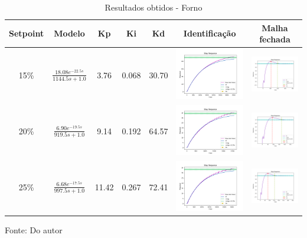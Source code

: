 \begin{table}[H]
    \caption{Resultados obtidos - Forno}
    \centering
    \begin{tabular}{|c|c|c|c|c|c|c|}
        \hline
        \textbf{Setpoint} & \textbf{Modelo}                          & \textbf{Kp} & \textbf{Ki} & \textbf{Kd} & \textbf{Identificação} & \textbf{Malha fechada} \\
        \hline
        15\%              & $\frac{18.08 e^{-22.5s}}{1144.5s + 1.0}$ & 3.76        & 0.068       & 30.70       & \includegraphics[width=0.2\linewidth]{figuras/forno_15} & \includegraphics[width=0.2\linewidth]{figuras/forno_15c} \\
        \hline
        20\%              & $\frac{6.90 e^{-19.5s}}{919.5s + 1.0}$   & 9.14        & 0.192       & 64.57       & \includegraphics[width=0.2\linewidth]{figuras/forno_20} & \includegraphics[width=0.2\linewidth]{figuras/forno_20c} \\
        \hline
        25\%              & $\frac{6.68 e^{-17.5s}}{997.5s + 1.0}$   & 11.42       & 0.267       & 72.41       & \includegraphics[width=0.2\linewidth]{figuras/forno_25} & \includegraphics[width=0.2\linewidth]{figuras/forno_25c} \\
        \hline
    \end{tabular}
    \label{tab:results_forno}
    \vspace{0cm}\hspace{0cm}\small{Fonte: Do autor}
\end{table}


